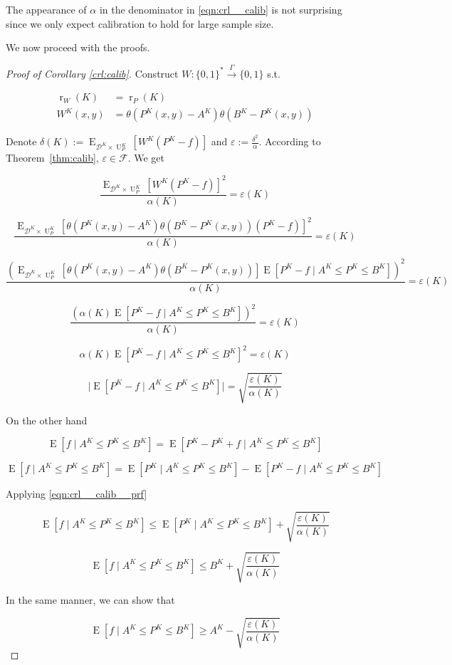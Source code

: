 \documentclass[11pt]{article}
\numberwithin{equation}{section}
\theoremstyle{definition}
\theoremstyle{plain}
\newcommand{\Bool}{\{0,1\}}
\newcommand{\Words}{{\Bool^*}}
\DeclareMathOperator{\E}{E}
\DeclareMathOperator{\R}{r}
\DeclareMathOperator{\Un}{U}
\newcommand{\Abs}[1]{\lvert #1 \rvert}
\newcommand{\Dist}{\mathcal{D}}
\newcommand{\Fall}{\mathcal{F}}
\newcommand{\Scheme}{\xrightarrow{\Gamma}}
\begin{document}
The appearance of $\alpha$ in the denominator in \ref{eqn:crl__calib} is not surprising since we only expect calibration to hold for large sample size.

We now proceed with the proofs.

\begin{proof}[Proof of Corollary \ref{crl:calib}]

Construct $W: \Words \Scheme \Bool$ s.t. 

\begin{align*}
\R_W(K) &= \R_P(K) \\
W^{K}(x,y)&=\theta(P^{K}(x,y)-A^{K})\theta(B^{K}-P^{K}(x,y))
\end{align*}

Denote $\delta(K):=\E_{\Dist^{K} \times \Un_P^{K}}[W^{K}(P^{K}-f)]$ and $\varepsilon:=\frac{\delta^2}{\alpha}$. According to Theorem~\ref{thm:calib}, $\varepsilon \in \Fall$.
We get

$$\frac{\E_{\Dist^{K} \times \Un_P^{K}}[W^{K}(P^{K}-f)]^2}{\alpha(K)} = \varepsilon(K)$$

$$\frac{\E_{\Dist^{K} \times \Un_P^{K}}[\theta(P^{K}(x,y)-A^{K})\theta(B^{K}-P^{K}(x,y))(P^{K}-f)]^2}{\alpha(K)} = \varepsilon(K)$$

$$\frac{(\E_{\Dist^{K} \times \Un_P^{K}}[\theta(P^{K}(x,y)-A^{K})\theta(B^{K}-P^{K}(x,y))]\E[P^{K}-f \mid A^{K} \leq P^{K} \leq B^{K}])^2}{\alpha(K)} = \varepsilon(K)$$

$$\frac{(\alpha(K)\E[P^{K}-f \mid A^{K} \leq P^{K} \leq B^{K}])^2}{\alpha(K)} = \varepsilon(K)$$

$$\alpha(K)\E[P^{K}-f \mid A^{K} \leq P^{K} \leq B^{K}]^2 = \varepsilon(K)$$

\begin{equation}
\label{eqn:crl__calib__prf}
\Abs{\E[P^{K}-f \mid A^{K} \leq P^{K} \leq B^{K}]} = \sqrt{\frac{\varepsilon(K)}{\alpha(K)}}
\end{equation}

On the other hand

$$\E[f \mid A^{K} \leq P^{K} \leq B^{K}] = \E[P^{K}-P^{K}+f \mid A^{K} \leq P^{K} \leq B^{K}]$$

$$\E[f \mid A^{K} \leq P^{K} \leq B^{K}] = \E[P^{K} \mid A^{K} \leq P^{K} \leq B^{K}]-\E[P^{K}-f \mid A^{K} \leq P^{K} \leq B^{K}]$$

Applying \ref{eqn:crl__calib__prf}

$$\E[f \mid A^{K} \leq P^{K} \leq B^{K}] \leq \E[P^{K} \mid A^{K} \leq P^{K} \leq B^{K}]+\sqrt{\frac{\varepsilon(K)}{\alpha(K)}}$$


$$\E[f \mid A^{K} \leq P^{K} \leq B^{K}] \leq B^{K} + \sqrt{\frac{\varepsilon(K)}{\alpha(K)}}$$

In the same manner, we can show that

$$\E[f \mid A^{K} \leq P^{K} \leq B^{K}] \geq A^{K} - \sqrt{\frac{\varepsilon(K)}{\alpha(K)}}$$
\end{proof}
\end{document}
